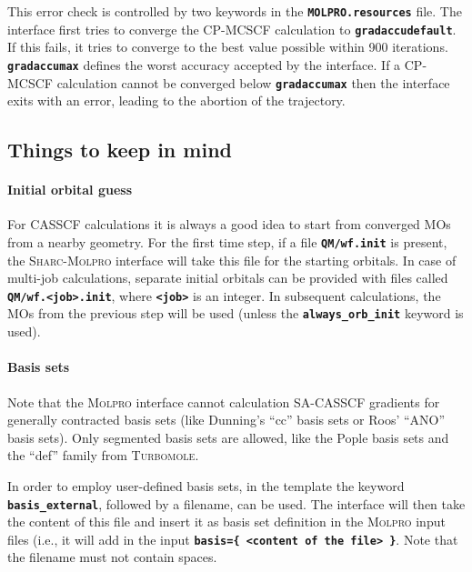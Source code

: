 \documentclass[a4paper,10pt,DIV=15,openany,twoside=false]{scrbook}
\newcommand{\sharc}{\textsc{Sharc}}
\newcommand{\ttt}[1]{\textbf{\texttt{#1}}}
\begin{document}
This error check is controlled by two keywords in the \ttt{MOLPRO.resources} file. The interface first tries to converge the CP-MCSCF calculation to \ttt{gradaccudefault}. If this fails, it tries to converge to the best value possible within 900 iterations. \ttt{gradaccumax} defines the worst accuracy accepted by the interface. If a CP-MCSCF calculation cannot be converged below \ttt{gradaccumax} then the interface exits with an error, leading to the abortion of the trajectory.

\subsection{Things to keep in mind}

\paragraph{Initial orbital guess}

For CASSCF calculations it is always a good idea to start from converged MOs from a nearby geometry. For the first time step, if a file \ttt{QM/wf.init} is present, the \sharc-\textsc{Molpro} interface will take this file for the starting orbitals. In case of multi-job calculations, separate initial orbitals can be provided with files called \ttt{QM/wf.<job>.init}, where \ttt{<job>} is an integer.
In subsequent calculations, the MOs from the previous step will be used (unless the \ttt{always\_orb\_init} keyword is used).

\paragraph{Basis sets}

Note that the \textsc{Molpro} interface cannot calculation SA-CASSCF gradients for generally contracted basis sets (like Dunning's ``cc'' basis sets or Roos' ``ANO'' basis sets). Only segmented basis sets are allowed, like the Pople basis sets and the ``def'' family from \textsc{Turbomole}.

In order to employ user-defined basis sets, in the template the keyword \ttt{basis\_external}, followed by a filename, can be used.
The interface will then take the content of this file and insert it as basis set definition in the \textsc{Molpro} input files (i.e., it will add in the input \ttt{basis=\{ <content of the file> \}}.
Note that the filename must not contain spaces.
\end{document}
